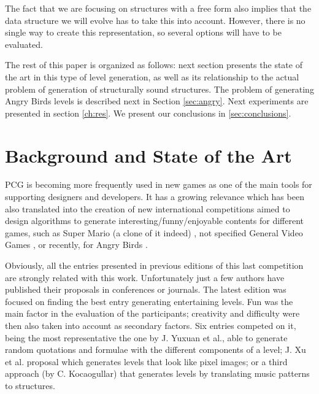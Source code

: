 \documentclass[sigconf]{acmart}
\begin{document}
The fact that we are focusing on structures with a free form also
implies that the data structure we will evolve has to take this into
account. However, there is no single way to create this representation,
 so several options will have to be evaluated. 

 

The rest of this paper is organized as follows: next section presents
the state of the art in this type of level generation, as well as its
relationship to the actual problem of generation of structurally sound
structures. The problem of generating Angry Birds levels is described
next in Section \ref{sec:angry}. Next experiments are presented in
section \ref{ch:res}. We present our conclusions in \ref{sec:conclusions}.


\section{Background and State of the Art}
\label{sec:soa}

PCG is becoming more frequently used in new games as one of the main
tools for supporting designers and developers. It has a growing
relevance which has been also translated into the creation of new
international competitions aimed to design algorithms to generate
interesting/funny/enjoyable contents for different games, such as
Super Mario (a clone of it indeed) \cite{MarioAI_Level_12}, not
specified General Video Games
\cite{GAIG_LevelGeneration_18,Khalifa_GVGLG_16}, or recently, for
Angry Birds \cite{AngryBirds_LevelGeneration_18}. 

Obviously, all the entries presented in previous editions of this last
competition are strongly related with this
work. Unfortunately just a few  authors have published their
proposals in conferences or journals. The latest edition
\cite{AngryBirds_LevelGeneration_18} was focused on finding the best 
entry generating entertaining levels. Fun was the main factor in the
evaluation of the participants;  creativity and difficulty were then
also taken into account as secondary factors. 
Six entries competed on it, being the most representative the one by
J. Yuxuan et al., able to generate random quotations and formulae with
the different components of a level; J. Xu et al. proposal which
generates levels that look like pixel images; or a third approach (by
C. Kocaogullar) that generates levels by translating music patterns to
structures. %
\end{document}
